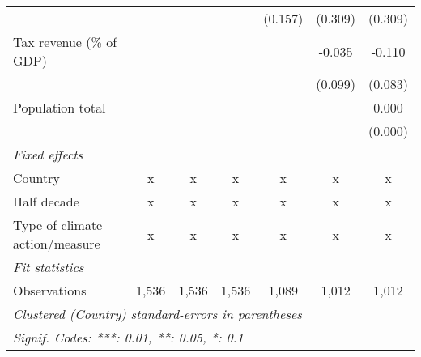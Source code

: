 \begin{tabular}{lcccccc}
                                                                        &         &         &               & (0.157)     & (0.309)     & (0.309)\\   
   Tax revenue (\% of GDP)                                              &         &         &               &             & -0.035      & -0.110\\   
                                                                        &         &         &               &             & (0.099)     & (0.083)\\   
   Population total                                                     &         &         &               &             &             & 0.000\\   
                                                                        &         &         &               &             &             & (0.000)\\   
   \emph{Fixed effects}\\
   Country                                                              & x       & x       & x             & x           & x           & x\\  
   Half decade                                                          & x       & x       & x             & x           & x           & x\\  
   Type of climate action/measure                                       & x       & x       & x             & x           & x           & x\\  
   \midrule \emph{Fit statistics}\\
   Observations                                                         & 1,536   & 1,536   & 1,536         & 1,089       & 1,012       & 1,012\\  
   \midrule
   \multicolumn{7}{l}{\emph{Clustered (Country) standard-errors in parentheses}}\\
   \multicolumn{7}{l}{\emph{Signif. Codes: ***: 0.01, **: 0.05, *: 0.1}}\\
\end{tabular}
\par\endgroup


